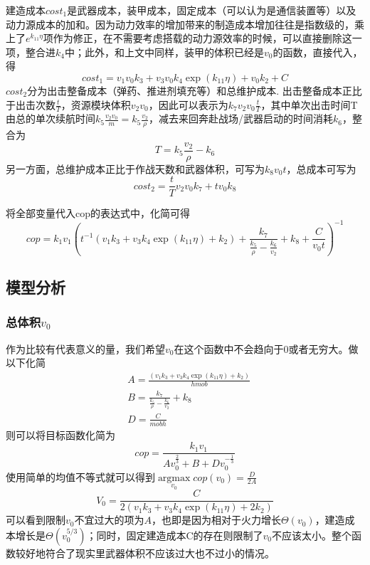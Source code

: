 \documentclass[UTF8]{mcmthesis}
\DeclareMathOperator*{\argmax}{argmax}
\begin{document}
建造成本$cost_1$是武器成本，装甲成本，固定成本（可以认为是通信装置等）以及动力源成本的加和。因为动力效率的增加带来的制造成本增加往往是指数级的，乘上了$e^{k_{11}\eta}$项作为修正，在不需要考虑搭载的动力源效率的时候，可以直接删除这一项，整合进$k_4$中；此外，和上文中同样，装甲的体积已经是$v_0$的函数，直接代入，得
\begin{equation}
cost_1=v_1v_0k_3+v_3v_0k_4\exp(k_{11}\eta)+v_0k_2+C
\end{equation}
$cost_2$分为出击整备成本（弹药、推进剂填充等）和总维护成本.
出击整备成本正比于出击次数$\frac{t}{T}$，资源模块体积$v_2v_0$，因此可以表示为$k_7v_2v_0\frac{t}{T}$，其中单次出击时间T由总的单次续航时间$k_5\frac{v_2v_0}{m}=k_5\frac{v_2}{\rho}$，减去来回奔赴战场/武器启动的时间消耗$k_6$，整合为
\begin{equation}
T=k_5\frac{v_2}{\rho}-k_6
\end{equation}
另一方面，总维护成本正比于作战天数和武器体积，可写为$k_8v_0t$，总成本可写为
\begin{equation}
cost_2=\frac{t}{T}v_2v_0k_7+tv_0k_8
\end{equation}

将全部变量代入cop的表达式中，化简可得
\begin{equation}
cop=k_1v_1\left(t^{-1}(v_1k_3+v_3k_4\exp(k_{11}\eta)+k_2)+\frac{k_7}{\frac{k_5}{\rho}-\frac{k_6}{v_2}}+k_8+\frac{C}{v_0t}\right)^{-1}
\end{equation}

\subsection{模型分析}
\subsubsection{总体积$v_0$}
作为比较有代表意义的量，我们希望$v_0$在这个函数中不会趋向于0或者无穷大。做以下化简
\begin{align*}
&A=\frac{(v_1k_3+v_3k_4\exp(k_{11}\eta)+k_2)}{h mob}\\
&B=\frac{k_7}{\frac{k_5}{\rho}-\frac{k_6}{v_2}}+k_8\\
&D=\frac{C}{mob h}
\end{align*}
则可以将目标函数化简为
\begin{equation}
cop=\frac{k_1v_1}{Av_0^{\frac{2}{3}}+B+Dv_0^{-\frac{1}{3}}}
\end{equation}
使用简单的均值不等式就可以得到$\argmax \limits_{v_0} cop(v_0)=\frac{D}{2A}$
\begin{equation}
V_0=\frac{C}{2(v_1k_3+v_3k_4\exp(k_{11}\eta)+2k_2)}
\end{equation}
可以看到限制$v_0$不宜过大的项为$A$，也即是因为相对于火力增长$\Theta(v_0)$，建造成本增长是$\Theta(v_0^{5/3})$；同时，固定建造成本C的存在则限制了$v_0$不应该太小。整个函数较好地符合了现实里武器体积不应该过大也不过小的情况。
\end{document}
